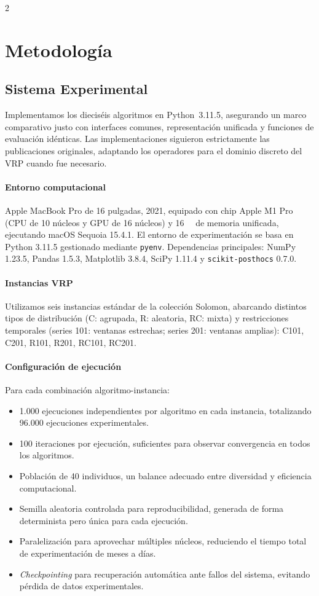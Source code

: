 \documentclass[10pt,a4paper]{extarticle}
\begin{document}
\begin{multicols}{2}
\section{Metodología}
\subsection{Sistema Experimental}
Implementamos los dieciséis algoritmos en Python~3.11.5, asegurando un marco comparativo justo con interfaces comunes, representación unificada y funciones de evaluación idénticas. Las implementaciones siguieron estrictamente las publicaciones originales, adaptando los operadores para el dominio discreto del VRP cuando fue necesario.

\paragraph{Entorno computacional} Apple MacBook Pro de 16 pulgadas, 2021, equipado con chip Apple M1 Pro (CPU de 10 núcleos y GPU de 16 núcleos) y \SI{16}{\giga\byte} de memoria unificada, ejecutando macOS Sequoia 15.4.1. El entorno de experimentación se basa en Python 3.11.5 gestionado mediante \texttt{pyenv}. Dependencias principales: NumPy 1.23.5, Pandas 1.5.3, Matplotlib 3.8.4, SciPy 1.11.4 y \texttt{scikit-posthocs} 0.7.0.

\paragraph{Instancias VRP} Utilizamos seis instancias estándar de la colección Solomon, abarcando distintos tipos de distribución (C: agrupada, R: aleatoria, RC: mixta) y restricciones temporales (series 101: ventanas estrechas; series 201: ventanas amplias): C101, C201, R101, R201, RC101, RC201.

\paragraph{Configuración de ejecución} Para cada combinación algoritmo-instancia:
\begin{itemize}
\item 1.000 ejecuciones independientes por algoritmo en cada instancia, totalizando 96.000 ejecuciones experimentales.
\item 100 iteraciones por ejecución, suficientes para observar convergencia en todos los algoritmos.
\item Población de 40 individuos, un balance adecuado entre diversidad y eficiencia computacional.
\item Semilla aleatoria controlada para reproducibilidad, generada de forma determinista pero única para cada ejecución.
\item Paralelización para aprovechar múltiples núcleos, reduciendo el tiempo total de experimentación de meses a días.
\item \textit{Checkpointing} para recuperación automática ante fallos del sistema, evitando pérdida de datos experimentales.
\end{itemize}


\end{multicols}
\end{document}
